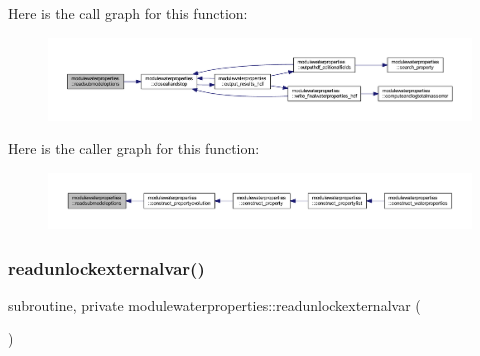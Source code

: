 Here is the call graph for this function\+:\nopagebreak
\begin{figure}[H]
\begin{center}
\leavevmode
\includegraphics[width=350pt]{namespacemodulewaterproperties_a5a214d6f2f108bf67d3db3df4165609d_cgraph}
\end{center}
\end{figure}
Here is the caller graph for this function\+:\nopagebreak
\begin{figure}[H]
\begin{center}
\leavevmode
\includegraphics[width=350pt]{namespacemodulewaterproperties_a5a214d6f2f108bf67d3db3df4165609d_icgraph}
\end{center}
\end{figure}
\mbox{\label{namespacemodulewaterproperties_ac4ba6844cdc46e6fc258842be3a9e82b}} 
\subsubsection{\texorpdfstring{readunlockexternalvar()}{readunlockexternalvar()}}
{\footnotesize\ttfamily subroutine, private modulewaterproperties\+::readunlockexternalvar (\begin{DoxyParamCaption}{ }\end{DoxyParamCaption})\hspace{0.3cm}{\ttfamily [private]}}

